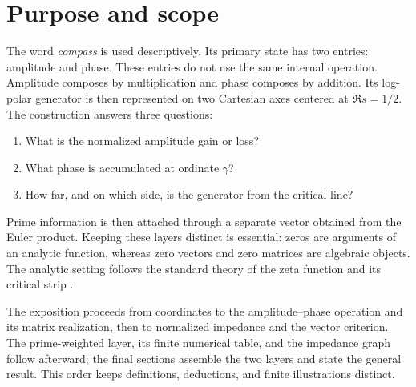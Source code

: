 \documentclass[11pt]{article}
\begin{document}
\section{Purpose and scope}
The word \emph{compass} is used descriptively.  Its primary state has two entries: amplitude
and phase.  These entries do not use the same internal operation.  Amplitude composes by
multiplication and phase composes by addition.  Its log-polar generator is then represented on
two Cartesian axes centered at $\Re s=1/2$.  The construction answers three questions:
\begin{enumerate}
 \item What is the normalized amplitude gain or loss?
 \item What phase is accumulated at ordinate $\gamma$?
 \item How far, and on which side, is the generator from the critical line?
\end{enumerate}
Prime information is then attached through a separate vector obtained from the Euler product.
Keeping these layers distinct is essential: zeros are arguments of an analytic function,
whereas zero vectors and zero matrices are algebraic objects.  The analytic setting follows the
standard theory of the zeta function and its critical strip
\cite{Riemann,Titchmarsh,Bombieri,DLMFzeros}.

The exposition proceeds from coordinates to the amplitude--phase operation and its matrix
realization, then to normalized impedance and the vector criterion.  The prime-weighted layer,
its finite numerical table, and the impedance graph follow afterward; the final sections assemble
the two layers and state the general result.  This order keeps definitions, deductions, and finite
illustrations distinct.
\end{document}

